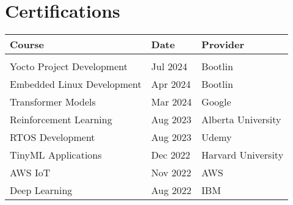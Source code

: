 \documentclass[a4paper,12pt]{article}
\begin{document}

\section{Certifications}
\begin{tabularx}{\linewidth}{@{}l l l@{}}
\textbf{Course} & \textbf{Date} & \textbf{Provider} \\ \hline
\\
Yocto Project Development & Jul 2024 & Bootlin \\
Embedded Linux Development & Apr 2024 & Bootlin \\
Transformer Models & Mar 2024 & Google \\
Reinforcement Learning & Aug 2023 & Alberta University \\
RTOS Development & Aug 2023 & Udemy \\
TinyML Applications & Dec 2022 & Harvard University \\
AWS IoT & Nov 2022 & AWS \\
Deep Learning & Aug 2022 & IBM \\
\end{tabularx}

\vfill
{}
\end{document}
